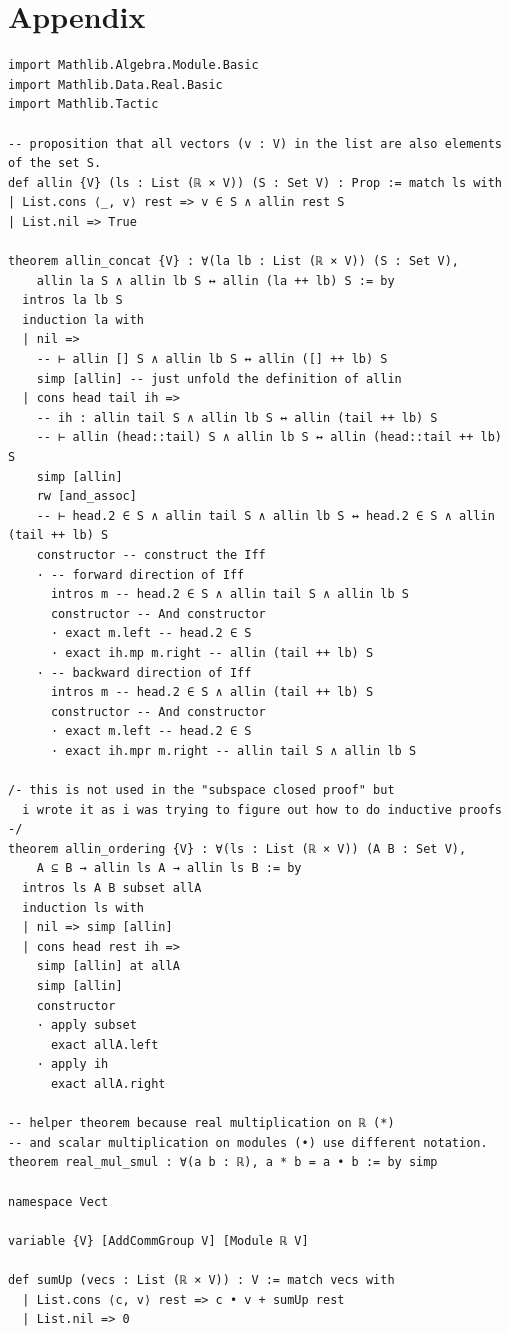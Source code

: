 \documentclass{article}
\begin{document}
\section{Appendix}
    \begin{lstlisting}
import Mathlib.Algebra.Module.Basic
import Mathlib.Data.Real.Basic
import Mathlib.Tactic

-- proposition that all vectors (v : V) in the list are also elements of the set S.
def allin {V} (ls : List (ℝ × V)) (S : Set V) : Prop := match ls with
| List.cons ⟨_, v⟩ rest => v ∈ S ∧ allin rest S
| List.nil => True

theorem allin_concat {V} : ∀(la lb : List (ℝ × V)) (S : Set V),
    allin la S ∧ allin lb S ↔ allin (la ++ lb) S := by
  intros la lb S
  induction la with
  | nil =>
    -- ⊢ allin [] S ∧ allin lb S ↔ allin ([] ++ lb) S
    simp [allin] -- just unfold the definition of allin
  | cons head tail ih =>
    -- ih : allin tail S ∧ allin lb S ↔ allin (tail ++ lb) S
    -- ⊢ allin (head::tail) S ∧ allin lb S ↔ allin (head::tail ++ lb) S
    simp [allin]
    rw [and_assoc]
    -- ⊢ head.2 ∈ S ∧ allin tail S ∧ allin lb S ↔ head.2 ∈ S ∧ allin (tail ++ lb) S
    constructor -- construct the Iff
    · -- forward direction of Iff
      intros m -- head.2 ∈ S ∧ allin tail S ∧ allin lb S
      constructor -- And constructor
      · exact m.left -- head.2 ∈ S
      · exact ih.mp m.right -- allin (tail ++ lb) S
    · -- backward direction of Iff
      intros m -- head.2 ∈ S ∧ allin (tail ++ lb) S
      constructor -- And constructor
      · exact m.left -- head.2 ∈ S
      · exact ih.mpr m.right -- allin tail S ∧ allin lb S

/- this is not used in the "subspace closed proof" but
  i wrote it as i was trying to figure out how to do inductive proofs -/
theorem allin_ordering {V} : ∀(ls : List (ℝ × V)) (A B : Set V),
    A ⊆ B → allin ls A → allin ls B := by
  intros ls A B subset allA
  induction ls with
  | nil => simp [allin]
  | cons head rest ih =>
    simp [allin] at allA
    simp [allin]
    constructor
    · apply subset
      exact allA.left
    · apply ih
      exact allA.right

-- helper theorem because real multiplication on ℝ (*)
-- and scalar multiplication on modules (•) use different notation.
theorem real_mul_smul : ∀(a b : ℝ), a * b = a • b := by simp

namespace Vect

variable {V} [AddCommGroup V] [Module ℝ V]

def sumUp (vecs : List (ℝ × V)) : V := match vecs with
  | List.cons ⟨c, v⟩ rest => c • v + sumUp rest
  | List.nil => 0


\end{lstlisting}
\end{document}
